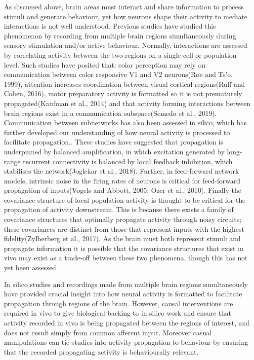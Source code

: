 As discussed above, brain areas must interact and share information to process stimuli and generate behaviour, yet how neurons shape their activity to mediate interactions is not well understood. Previous studies have studied this phenomenon by recording from multiple brain regions simultaneously during sensory stimulation and/or active behaviour. Normally, interactions are assessed by correlating activity between the two regions on a single cell or population level. Such studies have posited that: color perception may rely on communication between color responsive V1 and V2 neurons(Roe and Ts’o, 1999), attention increases coordination between visual cortical regions(Ruff and Cohen, 2016), motor preparatory activity is formatted so it is not prematurely propagated(Kaufman et al., 2014) and that activity forming interactions between brain regions exist in a communication subspace(Semedo et al., 2019). 
Communication between subnetworks has also been assessed in silico, which has further developed our understanding of how neural activity is processed to facilitate propagation.. These studies have suggested that propagation is underpinned by balanced amplification, in which excitation generated by long-range recurrent connectivity is balanced by local feedback inhibition, which stabilises the network(Joglekar et al., 2018). Further, in feed-forward network models, intrinsic noise in the firing rates of neurons is critical for feed-forward propagation of inputs(Vogels and Abbott, 2005; Ozer et al., 2010). Finally the covariance structure of local population activity is thought to be critical for the propagation of activity downstream. This is because there exists a family of covariance structures that optimally propagate activity through noisy circuits; these covariances are distinct from those that represent inputs with the highest fidelity(Zylberberg et al., 2017). As the brain must both represent stimuli and propagate information it is possible that the covariance structures that exist in vivo may exist as a trade-off between these two phenomena, though this has not yet been assessed.  

In silico studies and recordings made from multiple brain regions simultaneously have provided crucial insight into how neural activity is formatted to facilitate propagation through regions of the brain. However, causal interventions are required in vivo to give biological backing to in silico work and ensure that activity recorded in vivo is being propagated between the regions of interest, and does not result simply from common afferent input. Moreover casual manipulations can tie studies into activity propagation to behaviour by ensuring that the recorded propagating activity is behaviourally relevant. 

